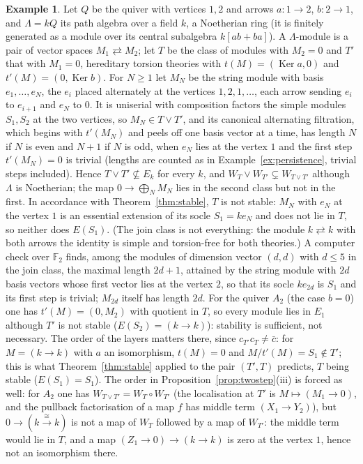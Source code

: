 \documentclass[11pt]{amsart}
\theoremstyle{definition}
\newtheorem{ex}[thm]{Example}
\begin{document}
\begin{ex}\label{ex:cycle}
Let $Q$ be the quiver with vertices $1,2$ and arrows $a\colon1\to2$,
$b\colon2\to1$, and $\Lambda=kQ$ its path algebra over a field $k$, a
Noetherian ring (it is finitely generated as a module over its central
subalgebra $k[ab+ba]$). A $\Lambda$-module is a pair of vector spaces
$M_1\rightleftarrows M_2$; let $T$ be the class of modules with $M_2=0$ and
$T'$ that with $M_1=0$, hereditary torsion theories with $t(M)=
(\operatorname{Ker}a,0)$ and $t'(M)=(0,\operatorname{Ker}b)$. For $N\ge1$ let
$M_N$ be the string module with basis $e_1,\dots,e_N$, the $e_i$ placed
alternately at the vertices $1,2,1,\dots$, each arrow sending $e_i$ to
$e_{i+1}$ and $e_N$ to $0$. It is uniserial with composition factors the
simple modules $S_1,S_2$ at the two vertices, so $M_N\in T\vee T'$, and its
canonical alternating filtration, which begins with $t'(M_N)$ and peels
off one basis vector at a time, has length $N$ if $N$ is even and $N+1$ if
$N$ is odd, when $e_N$ lies at the vertex $1$ and the first step
$t'(M_N)=0$ is trivial (lengths are counted as in
Example~\ref{ex:persistence}, trivial steps included). Hence $T\vee T'\not\subseteq E_k$ for every $k$,
and $W_T\vee W_{T'}\subsetneq W_{T\vee T'}$ although $\Lambda$ is
Noetherian; the map $0\to\bigoplus_NM_N$ lies in the second class but not
in the first. In accordance with Theorem~\ref{thm:stable}, $T$ is not
stable: $M_N$ with $e_N$ at the vertex $1$ is an essential extension of its
socle $S_1=ke_N$ and does not lie in $T$, so neither does $E(S_1)$. (The
join class is not everything: the module $k\rightleftarrows k$ with both
arrows the identity is simple and torsion-free for both theories.) A
computer check over $\mathbb F_2$ finds, among the modules of dimension
vector $(d,d)$ with $d\le5$ in the join class, the maximal length $2d+1$,
attained by the string module with $2d$ basis vectors whose first vector
lies at the vertex $2$, so that its socle $ke_{2d}$ is $S_1$ and its first
step is trivial; $M_{2d}$ itself has length $2d$. For the quiver $A_2$ (the case $b=0$) one has
$t'(M)=(0,M_2)$ with quotient in $T$, so every module lies in $E_1$ although
$T'$ is not stable ($E(S_2)=(k\to k)$): stability is sufficient, not
necessary. The order of the layers matters there, since
$c_{T'}c_T\neq\bar c$: for $M=(k\to k)$ with $a$ an isomorphism, $t(M)=0$
and $M/t'(M)=S_1\notin T'$; this is what Theorem~\ref{thm:stable} applied
to the pair $(T',T)$ predicts, $T$ being stable ($E(S_1)=S_1$). The order
in Proposition~\ref{prop:twostep}(iii) is forced as well: for $A_2$ one has
$W_{T\vee T'}=W_T\circ W_{T'}$ (the localisation at $T'$ is $M\mapsto
(M_1\to0)$, and the pullback factorisation of a map $f$ has middle term
$(X_1\to Y_2)$), but $0\to(k\xrightarrow{\ \cong\ }k)$ is not a map of
$W_T$ followed by a map of $W_{T'}$: the middle term would lie in $T$, and
a map $(Z_1\to0)\to(k\to k)$ is zero at the vertex $1$, hence not an
isomorphism there.
\end{ex}
\end{document}
